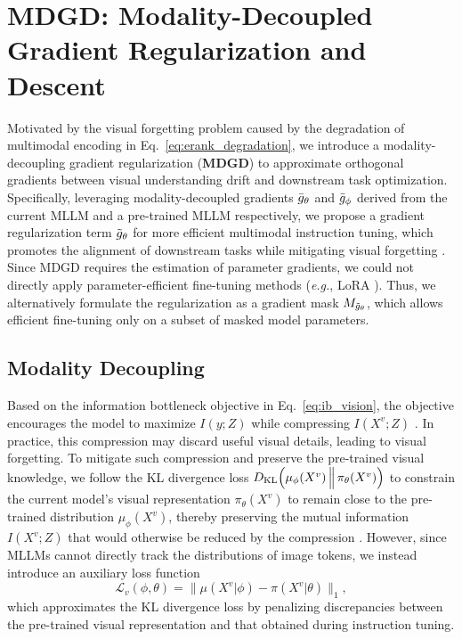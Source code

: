 \section{MDGD: Modality-Decoupled Gradient Regularization and Descent}
Motivated by the visual forgetting problem caused by the degradation of multimodal encoding in Eq.~\eqref{eq:erank_degradation}, we introduce a modality-decoupling gradient regularization (\textbf{MDGD}) to approximate orthogonal gradients between visual understanding drift and downstream task optimization. Specifically, leveraging modality-decoupled gradients $\Bar{g}_\theta$ and $\Bar{g}_\phi$ derived from the current MLLM and a pre-trained MLLM respectively, we propose a gradient regularization term $\Tilde{g}_\theta$ for more efficient multimodal instruction tuning, which promotes the alignment of downstream tasks while mitigating visual forgetting \cite{zhu2024model}. Since MDGD requires the estimation of parameter gradients, we could not directly apply parameter-efficient fine-tuning methods (\emph{e.g.}, LoRA \cite{hu2021lora}). Thus, we alternatively formulate the regularization as a gradient mask $M_{\Tilde{g}_\theta}$, which allows efficient fine-tuning only on a subset of masked model parameters.

\subsection{Modality Decoupling}
Based on the information bottleneck objective in Eq.~\eqref{eq:ib_vision}, the objective encourages the model to maximize $I(y; Z)$ while compressing $I(X^v; Z)$ \cite{tishby2000information, alemi2016deep}. 
In practice, this compression may discard useful visual details, leading to visual forgetting. To mitigate such compression and preserve the pre-trained visual knowledge, we follow the KL divergence loss
$D_{\text{KL}}\Bigl(\mu_\phi(X^v) \,\Big\|\, \pi_\theta (X^v)\Bigr)$
to constrain the current model’s visual representation $\pi_\theta(X^v)$ to remain close to the pre-trained distribution $\mu_\phi(X^v)$, 
thereby preserving the mutual information $I(X^v; Z)$ that would otherwise be reduced by the compression \cite{hinton2015distilling, lopez2018information}. 
However, since MLLMs cannot directly track the distributions of image tokens, we instead introduce an auxiliary loss function
\begin{equation}\label{eq:visual_loss}
    \mathcal{L}_v(\phi,\theta) = \|\mu(X^v|\phi) - \pi(X^v|\theta)\|_1,
\end{equation}
which approximates the KL divergence loss \cite{zhu2022wdibs,zhu2017unpaired} by penalizing discrepancies between the pre-trained visual representation and that obtained during instruction tuning. 


